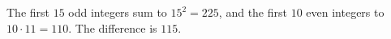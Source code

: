 The first $15$ odd integers sum to $15^2=225$, and the first $10$ even integers to $10\cdot11=110$. The difference is $\boxed{115}$.
